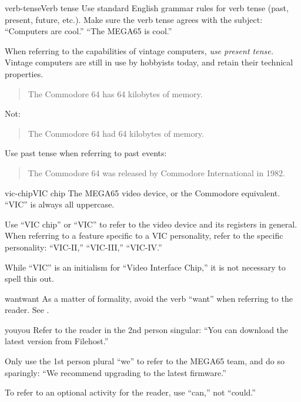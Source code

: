 \begin{sgentry}{verb-tense}{Verb tense}
    Use standard English grammar rules for verb tense (past, present, future, etc.). Make sure the verb tense agrees with the subject: ``Computers are cool.'' ``The MEGA65 is cool.''

    When referring to the capabilities of vintage computers, \emph{use present tense.} Vintage computers are still in use by hobbyists today, and retain their technical properties.

    \begin{quote}
        The Commodore 64 has 64 kilobytes of memory.
    \end{quote}

    Not:

    \begin{quote}
        The Commodore 64 had 64 kilobytes of memory.
    \end{quote}

    Use past tense when referring to past events:

    \begin{quote}
        The Commodore 64 was released by Commodore International in 1982.
    \end{quote}
\end{sgentry}

\begin{sgentry}{vic-chip}{VIC chip}
    The MEGA65 video device, or the Commodore equivalent. ``VIC'' is always all uppercase.

    Use ``VIC chip'' or ``VIC'' to refer to the video device and its registers in general. When referring to a feature specific to a VIC personality, refer to the specific personality: ``VIC-II,'' ``VIC-III,'' ``VIC-IV.''

    While ``VIC'' is an initialism for ``Video Interface Chip,'' it is not necessary to spell this out.
\end{sgentry}

\begin{sgentry}{want}{want}
    As a matter of formality, avoid the verb ``want'' when referring to the reader. See .
\end{sgentry}

\begin{sgentry}{you}{you}
    Refer to the reader in the 2nd person singular: ``You can download the latest version from Filehost.''

    Only use the 1st person plural ``we'' to refer to the MEGA65 team, and do so sparingly: ``We recommend upgrading to the latest firmware.''

    To refer to an optional activity for the reader, use ``can,'' not ``could.''
\end{sgentry}



